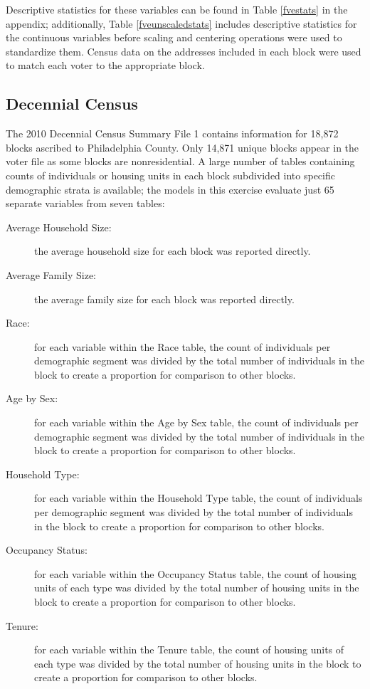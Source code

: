 \documentclass[12pt]{article}
\begin{document}
Descriptive statistics for these variables can be found in Table \ref{fvestats} in the appendix; additionally, Table \ref{fveunscaledstats} includes descriptive statistics for the continuous variables before scaling and centering operations were used to standardize them. Census data on the addresses included in each block were used to match each voter to the appropriate block.

\subsection{Decennial Census}
The 2010 Decennial Census Summary File 1 contains information for 18,872 blocks ascribed to Philadelphia County. Only 14,871 unique blocks appear in the voter file as some blocks are nonresidential. A large number of tables containing counts of individuals or housing units in each block subdivided into specific demographic strata is available; the models in this exercise evaluate just 65 separate variables from seven tables:

\begin{description}
\item [Average Household Size:] the average household size for each block was reported directly.
\item [Average Family Size:] the average family size for each block was reported directly.
\item [Race:] for each variable within the Race table, the count of individuals per demographic segment was divided by the total number of individuals in the block to create a proportion for comparison to other blocks.
\item [Age by Sex:] for each variable within the Age by Sex table, the count of individuals per demographic segment was divided by the total number of individuals in the block to create a proportion for comparison to other blocks.
\item [Household Type:] for each variable within the Household Type table, the count of individuals per demographic segment was divided by the total number of individuals in the block to create a proportion for comparison to other blocks.
\item [Occupancy Status:] for each variable within the Occupancy Status table, the count of housing units of each type was divided by the total number of housing units in the block to create a proportion for comparison to other blocks.
\item [Tenure:] for each variable within the Tenure table, the count of housing units of each type was divided by the total number of housing units in the block to create a proportion for comparison to other blocks.
\end{description}
\end{document}
